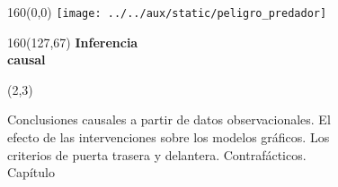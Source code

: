 \documentclass[shownotes,aspectratio=169]{beamer}
\newcounter{capitulo}
\newcommand{\unidad}{\thecapitulo \stepcounter{capitulo}}
\begin{document}
\begin{frame}

\begin{textblock}{160}(0,0)
\texttt{[image: ../../aux/static/peligro\_predador]}
\end{textblock}

\begin{textblock}{160}(127,67)
\LARGE \textcolor{black!5}{\fontsize{22}{0}\selectfont \textbf{Inferencia  \\[-0.1cm] \hspace{0.5cm} causal}}
\end{textblock}

\begin{textblock}{55}(2,3)
\begin{turn}{0}
\parbox{15cm}{\small \textcolor{black!95}{Conclusiones causales a partir de datos observacionales. El} \\
\textcolor{black!95}{efecto de las intervenciones sobre los modelos gráficos. Los} \\
\textcolor{black!95}{criterios de puerta trasera y delantera. Contrafácticos.} \\
\normalsize\textcolor{black!95}{Capítulo \unidad} \\
}
\end{turn}
\end{textblock}


\end{frame}
\end{document}
